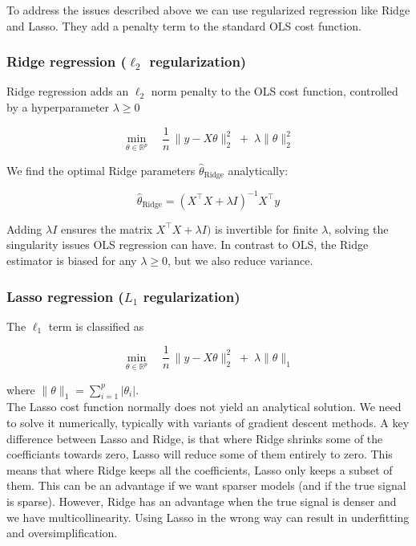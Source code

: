 \documentclass[amssymb,twocolumn,aps]{revtex4-2}
\begin{document}
To address the issues described above we can use regularized regression like Ridge and Lasso. They add a penalty term to the standard OLS cost function. \\

\subsubsection{Ridge regression ($\ell_2$ regularization)}
\label{subsubsec:rdg_theory}

Ridge regression adds an $\ell_2$ norm penalty to the OLS cost function, controlled by a hyperparameter $\lambda \ge 0$

\begin{equation}
\min_{\theta \in \mathbb{R}^p}
\quad
\frac{1}{n}\,\lVert y - X\theta \rVert_2^2
\;+\;
\lambda \lVert \theta \rVert_2^2
\end{equation}

We find the optimal Ridge parameters $\hat{\theta}_{\text{Ridge}}$ analytically: 

\begin{equation}
    \hat{\theta}_{\text{Ridge}}
= (X^\top X + \lambda I)^{-1} X^\top y
\end{equation}

Adding $\lambda I$ ensures the matrix $X^\top X + \lambda I)$ is invertible for finite $\lambda$, solving the singularity issues OLS regression can have. In contrast to OLS, the Ridge estimator is biased for any $\lambda \ge 0$, but we also reduce variance. \\

\subsubsection{Lasso regression ($L_1$ regularization)}
\label{subsubsec:lasso_theory}

The $\ell_1$ term is classified as 

\begin{equation}
\min_{\theta \in \mathbb{R}^p}
\quad
\frac{1}{n}\,\lVert y - X\theta \rVert_2^2
\;+\;
\lambda \lVert \theta \rVert_1
\end{equation}

where $\lVert \theta \rVert_1 = \sum_{i=1}^p \lvert \theta_i \rvert$. \\

The Lasso cost function normally does not yield an analytical solution. We need to solve it numerically, typically with variants of gradient descent methods. A key difference between Lasso and Ridge, is that where Ridge shrinks some of the coefficiants towards zero, Lasso will reduce some of them entirely to zero. This means that where Ridge keeps all the coefficients, Lasso only keeps a subset of them. This can be an advantage if we want sparser models (and if the true signal is sparse). However, Ridge has an advantage when the true signal is denser and we have multicollinearity. Using Lasso in the wrong way can result in underfitting and oversimplification. 
\end{document}

